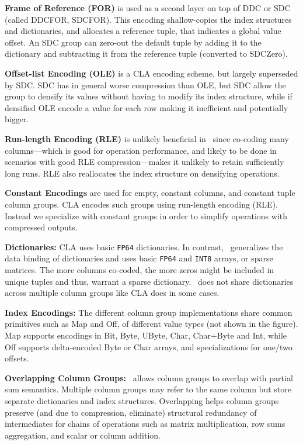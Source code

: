\textbf{Frame of Reference (FOR)} is used as a second layer on top of DDC or SDC (called DDCFOR, SDCFOR). This encoding shallow-copies the index structures and dictionaries, and allocates a reference tuple, that indicates a global value offset.
An SDC group can zero-out the default tuple by adding it to the dictionary and subtracting it from the reference tuple (converted to SDCZero).

\textbf{Offset-list Encoding (OLE)} is a CLA encoding scheme, but largely superseded by SDC. SDC has in general worse compression than OLE, but SDC allow the group to densify its values without having to modify its index structure, while if densified OLE encode a value for each row making it inefficient and potentially bigger.

\textbf{Run-length Encoding (RLE)} is unlikely beneficial in \name\ since co-coding many columns---which is good for operation performance, and likely to be done in scenarios with good RLE compression---makes it unlikely to retain sufficiently long runs. RLE also reallocates the index structure on densifying operations.

\textbf{Constant Encodings} are used for empty, constant columns, and constant tuple column groups. CLA encodes such groups using run-length encoding (RLE).
Instead we specialize with constant groups in order to simplify operations with compressed outputs.

\textbf{Dictionaries:} CLA uses basic \texttt{FP64} dictionaries. In contrast, \name \ generalizes the data binding of dictionaries and uses basic \texttt{FP64} and \texttt{INT8} arrays, or sparse matrices.
The more columns co-coded, the more zeros might be included in unique tuples and thus, warrant a sparse dictionary. \name \ does not share dictionaries across multiple column groups like CLA does in some cases.

\textbf{Index Encodings:} The different column group implementations share common primitives such as Map and Off, of different value types (not shown in the figure). Map supports encodings in Bit, Byte, UByte, Char, Char+Byte and Int, while Off supports delta-encoded Byte or Char arrays, and specializations for one/two offsets.

\textbf{Overlapping Column Groups:} \name\ allows column groups to overlap with partial sum semantics. Multiple column groups may refer to the same column but store separate dictionaries and index structures. Overlapping helps column groups preserve (and due to compression, eliminate) structural redundancy of intermediates for chains of operations such as matrix multiplication, row sums aggregation, and scalar or column addition.


